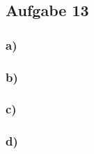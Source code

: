 \subsection*{Aufgabe 13}
\subsubsection*{a)}

\subsubsection*{b)}

\subsubsection*{c)}

\subsubsection*{d)}


